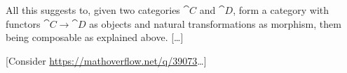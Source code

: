 All this suggests to, given two categories \(\cat C\) and \(\cat D\), form a category with functors \(\cat C \to \cat D\) as objects and natural transformations as morphism, them being composable as explained above. [\dots{}]

{\color{red}[Consider \url{https://mathoverflow.net/q/39073}\dots{}]}




